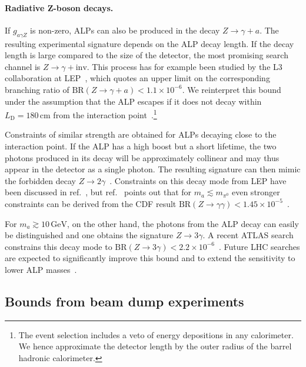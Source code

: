 \documentclass[11pt,a4paper]{article}
\begin{document}
\paragraph{Radiative Z-boson decays.}
If $g_{a\gamma Z}$ is non-zero, ALPs can also be produced in the decay $Z \to \gamma + a$. The resulting experimental signature depends on the ALP decay length. If the decay length is large compared to the size of the detector, the most promising search channel is $Z \to \gamma + \text{inv}$. This process has for example been studied by the L3 collaboration at LEP~\cite{Acciarri:1997im}, which quotes an upper limit on the corresponding branching ratio of $\text{BR}(Z \to \gamma + a) < 1.1 \times 10^{-6}$. We reinterpret this bound under the assumption that the ALP escapes if it does not decay within $L_\mathrm{D} = 180\,\mathrm{cm}$ from the interaction point~\cite{L3:1989aa}.\footnote{The event selection includes a veto of energy depositions in any calorimeter. We hence approximate the detector length by the outer radius of the barrel hadronic calorimeter.}

Constraints of similar strength are obtained for ALPs decaying close to the interaction point. If the ALP has a high boost but a short lifetime, the two photons produced in its decay will be approximately collinear and may thus appear in the detector as a single photon. The resulting signature can then mimic the forbidden decay $Z \to 2\gamma$~\cite{Jaeckel:2015jla,Chala:2015cev}. Constraints on this decay mode from LEP have been discussed in ref.~\cite{Jaeckel:2015jla}, but ref.~\cite{Bauer:2017ris} points out that for $m_a \lesssim m_{\pi^0}$ even stronger constraints can be derived from the CDF result $\text{BR}(Z \to \gamma \gamma) < 1.45 \times 10^{-5}$~\cite{Aaltonen:2013mfa}.

For $m_a \gtrsim 10\,\mathrm{GeV}$, on the other hand, the photons from the ALP decay can easily be distinguished and one obtains the signature $Z \to 3\gamma$. A recent ATLAS search constrains this decay mode to $\text{BR}(Z \to 3\gamma) < 2.2 \times 10^{-6}$~\cite{Aad:2015bua}. Future LHC searches are expected to significantly improve this bound and to extend the sensitivity to lower ALP masses~\cite{Bauer:2017ris}.

\subsection{Bounds from beam dump experiments}
\end{document}
